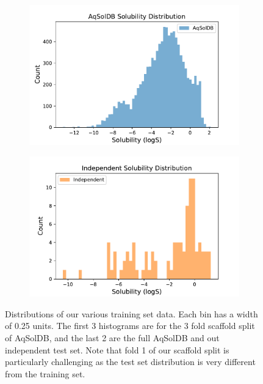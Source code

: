 \documentclass[journal=jcisd8,manuscript=article]{achemso}
\begin{document}
\begin{figure}[tb]
    
    \begin{subfigure}[t]{0.48\textwidth}
        \centering
        \includegraphics[width=\linewidth]{figures/AqSolDB_solhist.pdf}
    \end{subfigure}%
    \hfill
    \begin{subfigure}[t]{0.48\textwidth}
        \centering
        \includegraphics[width=\linewidth]{figures/Independent_solhist.pdf}
    \end{subfigure}
    \caption{Distributions of our various training set data. Each bin has a width of 0.25 units. The first 3 histograms are for the 3 fold scaffold split of AqSolDB, and the last 2 are the full AqSolDB and out independent test set. Note that fold 1 of our scaffold split is particularly challenging as the test set distribution is very different from the training set.}
    \label{fig:solhists}
\end{figure}
\end{document}
